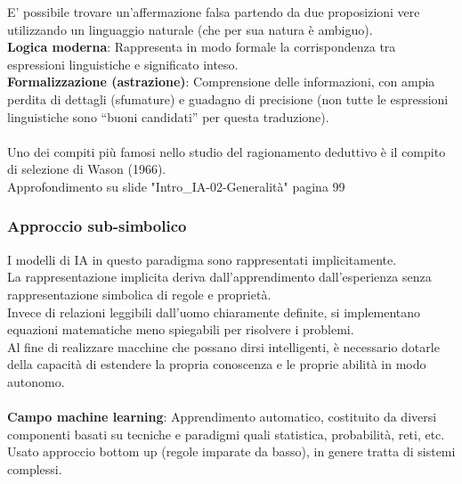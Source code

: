 \documentclass[../main.tex]{subfiles}
\begin{document}
	E’ possibile trovare un'affermazione falsa partendo da due proposizioni vere utilizzando un linguaggio naturale (che per sua natura è ambiguo).\\
	\textbf{Logica moderna}: Rappresenta in modo formale la corrispondenza tra espressioni linguistiche e significato inteso.\\
	\textbf{Formalizzazione (astrazione)}: Comprensione delle informazioni, con ampia perdita di dettagli (sfumature) e guadagno di precisione (non tutte le espressioni linguistiche sono “buoni candidati” per questa traduzione).\\ \\
	Uno dei compiti più famosi nello studio del ragionamento deduttivo è il compito di selezione di Wason (1966). \\
	{\color{red}Approfondimento su slide "Intro\_IA-02-Generalità" pagina 99}
	\subsubsection{Approccio sub-simbolico}
	I modelli di IA in questo paradigma sono rappresentati implicitamente. \\
	La rappresentazione implicita deriva dall'apprendimento dall'esperienza senza rappresentazione simbolica di regole e proprietà. \\ 
	Invece di relazioni leggibili dall'uomo chiaramente definite, si implementano equazioni matematiche meno spiegabili per risolvere i problemi.\\
	Al fine di realizzare macchine che possano dirsi intelligenti, è necessario dotarle della capacità di estendere la propria conoscenza e le proprie abilità in modo autonomo.\\ \\
	\textbf{Campo machine learning}: Apprendimento automatico, costituito da diversi componenti basati su tecniche e paradigmi quali statistica, probabilità, reti, etc.\\
	Usato approccio bottom up (regole imparate da basso), in genere tratta di sistemi complessi.
\end{document}

